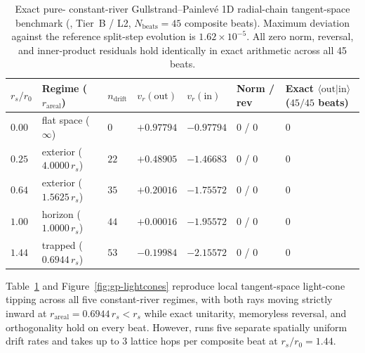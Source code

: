 \begin{table}[htbp]
\centering
\caption{Exact pure- constant-river Gullstrand--Painlev\'e 1D radial-chain tangent-space benchmark
(, Tier~B / L2, $N_{\mathrm{beats}} = 45$ composite beats). Maximum deviation against the reference
 split-step evolution is $1.62 \times 10^{-5}$. All zero norm, reversal, and inner-product residuals hold
identically in exact  arithmetic across all 45 beats.}
\label{tab:gp-walk}
\small
\begin{tabularx}{\textwidth}{@{}>{\raggedright\arraybackslash}p{1.2cm}>{\raggedright\arraybackslash}p{2.4cm}>{\raggedright\arraybackslash}p{1.1cm}>{\raggedright\arraybackslash}p{1.8cm}>{\raggedright\arraybackslash}p{1.8cm}>{\raggedright\arraybackslash}p{1.6cm}>{\raggedright\arraybackslash}X@{}}
\toprule
$r_s / r_0$ & Regime ($r_{\mathrm{areal}}$) & $n_{\mathrm{drift}}$ & $v_r(\mathrm{out})$ & $v_r(\mathrm{in})$ & Norm / rev & Exact $\langle \mathrm{out} | \mathrm{in} \rangle$ ($45/45$ beats) \\
\midrule
$0.00$ & flat space ($\infty$) & $0$ & $+0.97794$ & $-0.97794$ & $0$ / $0$ & $0$ \\
$0.25$ & exterior ($4.0000\, r_s$) & $22$ & $+0.48905$ & $-1.46683$ & $0$ / $0$ & $0$ \\
$0.64$ & exterior ($1.5625\, r_s$) & $35$ & $+0.20016$ & $-1.75572$ & $0$ / $0$ & $0$ \\
$1.00$ & horizon ($1.0000\, r_s$) & $44$ & $+0.00016$ & $-1.95572$ & $0$ / $0$ & $0$ \\
$1.44$ & trapped ($0.6944\, r_s$) & $53$ & $-0.19984$ & $-2.15572$ & $0$ / $0$ & $0$ \\
\bottomrule
\end{tabularx}
\end{table}

Table~\ref{tab:gp-walk} and Figure~\ref{fig:gp-lightcones} reproduce local tangent-space light-cone tipping across all
five constant-river regimes, with both rays moving strictly inward at $r_{\mathrm{areal}} = 0.6944\, r_s < r_s$ while
exact  unitarity, memoryless reversal, and orthogonality hold on every beat. However, 
runs five separate spatially uniform drift rates and takes up to 3 lattice hops per composite beat at $r_s/r_0 = 1.44$.

